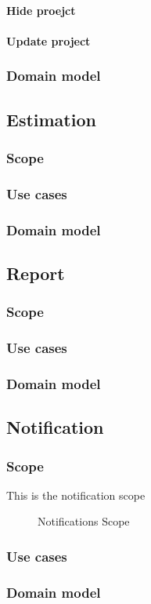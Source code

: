 \paragraph{Hide proejct}
\paragraph{Update project}
\subsubsection{Domain model}
\subsection{Estimation}
\subsubsection{Scope}
\subsubsection{Use cases}
\subsubsection{Domain model}
\subsection{Report}
\subsubsection{Scope}
\subsubsection{Use cases}
\subsubsection{Domain model}
\subsection{Notification}
\subsubsection{Scope}
This is the notification scope
	\begin{figure}[H]
	    	\centering
	    	\caption{Notifications Scope}
	    	\label{fig:Notification_Scope}
   	\end{figure}
\subsubsection{Use cases}
\subsubsection{Domain model}
